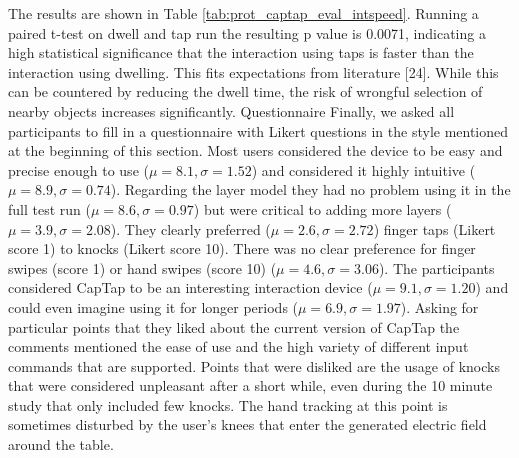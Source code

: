 The results are shown in Table \ref{tab:prot_captap_eval_intspeed}. Running a paired t-test on dwell and tap run the resulting p value is 0.0071, indicating a high statistical significance that the interaction using taps is faster than the interaction using dwelling. This fits expectations from literature [24]. While this can be countered by reducing the dwell time, the risk of wrongful selection of nearby objects increases significantly.
Questionnaire
Finally, we asked all participants to fill in a questionnaire with Likert questions in the style mentioned at the beginning of this section. Most users considered the device to be easy and precise enough to use ($\mu=8.1, \sigma=1.52$) and considered it highly intuitive ($\mu=8.9, \sigma=0.74$). Regarding the layer model they had no problem using it in the full test run ($\mu=8.6, \sigma=0.97$) but were critical to adding more layers ($\mu=3.9, \sigma=2.08$). They clearly preferred ($\mu=2.6, \sigma=2.72$) finger taps (Likert score 1) to knocks (Likert score 10). There was no clear preference for finger swipes (score 1) or hand swipes (score 10) ($\mu=4.6, \sigma=3.06$). The participants considered CapTap to be an interesting interaction device ($\mu=9.1, \sigma=1.20$) and could even imagine using it for longer periods ($\mu=6.9, \sigma=1.97$). Asking for particular points that they liked about the current version of CapTap the comments mentioned the ease of use and the high variety of different input commands that are supported. Points that were disliked are the usage of knocks that were considered unpleasant after a short while, even during the 10 minute study that only included few knocks. The hand tracking at this point is sometimes disturbed by the user’s knees that enter the generated electric field around the table.



